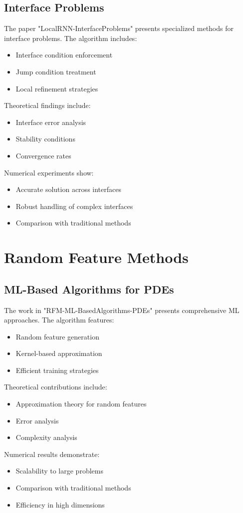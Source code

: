 \documentclass[12pt]{article}
\begin{document}
\subsection{Interface Problems}
\label{subsec:local_rnn_interface}
The paper "LocalRNN-InterfaceProblems" presents specialized methods for interface problems. The algorithm includes:
\begin{itemize}
    \item Interface condition enforcement
    \item Jump condition treatment
    \item Local refinement strategies
\end{itemize}
Theoretical findings include:
\begin{itemize}
    \item Interface error analysis
    \item Stability conditions
    \item Convergence rates
\end{itemize}
Numerical experiments show:
\begin{itemize}
    \item Accurate solution across interfaces
    \item Robust handling of complex interfaces
    \item Comparison with traditional methods
\end{itemize}

\section{Random Feature Methods}
\label{sec:rfm}

\subsection{ML-Based Algorithms for PDEs}
\label{subsec:rfm_ml}
The work in "RFM-ML-BasedAlgorithms-PDEs" presents comprehensive ML approaches. The algorithm features:
\begin{itemize}
    \item Random feature generation
    \item Kernel-based approximation
    \item Efficient training strategies
\end{itemize}
Theoretical contributions include:
\begin{itemize}
    \item Approximation theory for random features
    \item Error analysis
    \item Complexity analysis
\end{itemize}
Numerical results demonstrate:
\begin{itemize}
    \item Scalability to large problems
    \item Comparison with traditional methods
    \item Efficiency in high dimensions
\end{itemize}
\end{document}
